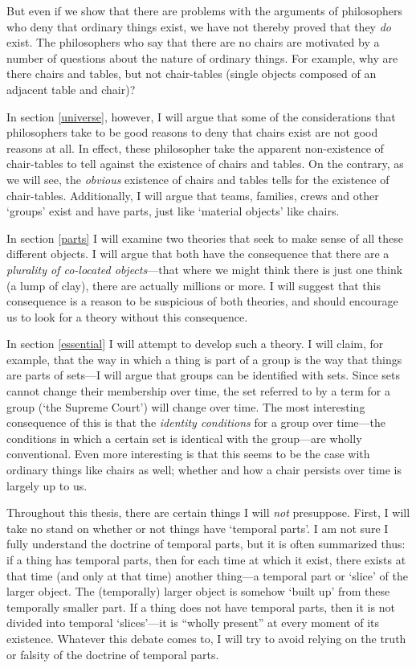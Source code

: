 \documentclass[11pt]{article}
\begin{document}
\begin{spacing}{1.5}
But even if we show that there are problems with the arguments of
philosophers who deny that ordinary things exist, we have not thereby
proved that they {\em do} exist.  The philosophers who say that there
are no chairs are motivated by a number of questions about the nature
of ordinary things.  For example, why are there chairs and tables, but
not chair-tables (single objects composed of an adjacent table and
chair)?

In section \ref{universe}, however, I will argue that some of the
considerations that philosophers take to be good reasons to deny that
chairs exist are not good reasons at all.  In effect, these
philosopher take the apparent non-existence of chair-tables to tell
against the existence of chairs and tables.  On the contrary, as we
will see, the {\em obvious} existence of chairs and tables tells for
the existence of chair-tables.  Additionally, I will argue that teams,
families, crews and other `groups' exist and have parts, just like
`material objects' like chairs.  

In section \ref{parts} I will examine two theories that seek to make
sense of all these different objects.  I will argue that both have the
consequence that there are a {\em plurality of co-located
  objects}---that where we might think there is just one think (a lump
of clay), there are actually millions or more.  I will suggest that
this consequence is a reason to be suspicious of both theories, and
should encourage us to look for a theory without this consequence.

In section \ref{essential} I will attempt to develop such a theory.  I
will claim, for example, that the way in which a thing is part of a
group is the way that things are parts of sets---I will argue that
groups can be identified with sets.  Since sets cannot change their
membership over time, the set referred to by a term for a group (`the
Supreme Court') will change over time.  The most interesting
consequence of this is that the {\em identity conditions} for a group
over time---the conditions in which a certain set is identical with
the group---are wholly conventional.  Even more interesting is that
this seems to be the case with ordinary things like chairs as well;
whether and how a chair persists over time is largely up to us.

Throughout this thesis, there are certain things I will {\em not}
presuppose.  First, I will take no stand on whether or not things have
`temporal parts'.  I am not sure I fully understand the doctrine of
temporal parts, but it is often summarized thus: if a thing has
temporal parts, then for each time at which it exist, there exists at
that time (and only at that time) another thing---a temporal part or
`slice' of the larger object.  The (temporally) larger object is
somehow `built up' from these temporally smaller part.  If a thing
does not have temporal parts, then it is not divided into temporal
`slices'---it is ``wholly present'' at every moment of its existence.
Whatever this debate comes to, I will try to avoid relying on the
truth or falsity of the doctrine of temporal parts.


\end{spacing}
\end{document}
